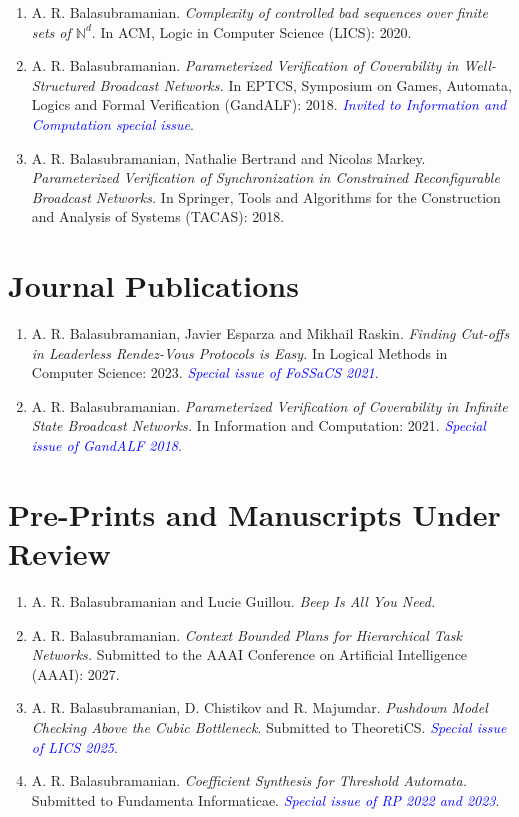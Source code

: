 \documentclass[11pt,a4paper,sans]{moderncv}        %
\begin{document}
\begin{enumerate}
	In LIPIcs, International Conference on Concurrency Theory (CONCUR): 2020.
	\item A. R. Balasubramanian. \textit{Complexity of controlled bad sequences over finite sets of $\mathbb{N}^d$}. In ACM, Logic in Computer Science (LICS): 2020.
	\item A. R. Balasubramanian. \textit{Parameterized Verification of Coverability in Well-Structured Broadcast Networks.} In EPTCS, 
	Symposium on Games, Automata, Logics and Formal Verification (GandALF): 2018. 
	\textit{\textcolor{blue}{Invited to Information and Computation special issue}}.
	\item A. R. Balasubramanian, Nathalie Bertrand and Nicolas Markey. \textit{Parameterized Verification of Synchronization in Constrained Reconfigurable Broadcast Networks.} In Springer, Tools and Algorithms for the Construction and Analysis of Systems (TACAS): 2018.
\end{enumerate}



\vspace{2pt}

\section{Journal Publications}
\begin{enumerate}
	\setlength\itemsep{2pt}
	\item A. R. Balasubramanian, Javier Esparza and Mikhail Raskin. \textit{Finding Cut-offs in Leaderless Rendez-Vous Protocols is Easy.} In Logical Methods in Computer Science: 2023. \textit{\textcolor{blue}{Special issue of FoSSaCS 2021}}.
	\item A. R. Balasubramanian. \textit{Parameterized Verification of Coverability in Infinite State Broadcast Networks.} In Information and Computation: 2021. \textit{\textcolor{blue}{Special issue of GandALF 2018}}.
\end{enumerate}

\vspace{2pt}

\section{Pre-Prints and Manuscripts Under Review}
\begin{enumerate}
	\setlength\itemsep{2pt}
	\item A. R. Balasubramanian and Lucie Guillou. \textit{Beep Is All You Need.} 
	\item A. R. Balasubramanian. \textit{Context Bounded Plans for Hierarchical Task Networks.} Submitted to the AAAI Conference on Artificial Intelligence (AAAI): 2027.
		\item A. R. Balasubramanian, D. Chistikov and R. Majumdar. 
	\textit{Pushdown Model Checking Above the Cubic Bottleneck}.
	Submitted to TheoretiCS. 
	\textit{\textcolor{blue}{Special issue of LICS 2025}}.
	\item A. R. Balasubramanian. \textit{Coefficient Synthesis for Threshold Automata.} Submitted to Fundamenta Informaticae. \textit{\textcolor{blue}{Special issue of RP 2022 and 2023}}.
\end{enumerate}
\end{document}
